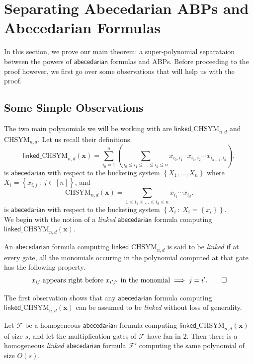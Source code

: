 \documentclass[10pt,a4paper]{article}
\def\set#1{\left\{ #1 \right\}}
\def\inparen#1{\left( #1 \right)}
\def\inbrace#1{\left\{ #1 \right\}}
\def\setdef#1#2{\inbrace{ #1 \ : \ #2}}
\def\vecx{\mathbf{x}}
\newcommand{\form}{\textbf{$\mathcal{F}$}}
\newcommand{\abcd}{\mathsf{abecedarian}}
\newcommand{\chsym}[2]{\mathrm{CHSYM}_{#1,#2}}
\newcommand{\lchsym}[2]{\mathrm{\mathsf{linked}\_CHSYM}_{#1,#2}}
\begin{document}
\section{Separating Abecedarian ABPs and Abecedarian Formulas}\label{sec:main}

In this section, we prove our main theorem: a super-polynomial separataion between the powers of $\abcd$ formulas and ABPs.
Before proceeding to the proof however, we first go over some observations that will help us with the proof.

\subsection{Some Simple Observations}

The two main polynomials we will be working with are $\lchsym{n}{d}$ and $\chsym{n}{d}$.
Let us recall their definitions.
\[
	\lchsym{n}{d}(\vecx) = \sum_{i_0=1}^{n} \inparen{\sum_{i_0 \leq i_1 \leq \ldots \leq i_d \leq n} x_{i_0, i_1} \cdot x_{i_1,i_2} \cdots x_{i_{d-1}, i_d}},
\]
is $\abcd$ with respect to the bucketing system $\set{X_1, \ldots, X_n}$ where $X_i = \setdef{x_{i,j}}{j \in [n]}$, and
\[
	\chsym{n}{d}(\vecx) = \sum_{1 \leq i_1 \leq \ldots \leq i_d \leq n} x_{i_1} \cdots x_{i_d}.	
\]
is $\abcd$ with respect to the bucketing system $\setdef{X_i}{X_i = \set{x_i}}$.\\

\noindent We begin with the notion of a \emph{linked} $\abcd$ formula computing $\lchsym{n}{d}(\vecx)$.

\begin{definition}
	An $\abcd$ formula computing $\lchsym{n}{d}$ is said to be \emph{linked} if at every gate, all the monomials occuring in the polynomial computed at that gate has the following property.
	\[
		x_{ij} \text{ appears right before } x_{i'j'} \text{ in the monomial} \implies j=i'. \qedhere	
	\]
\end{definition}

\noindent The first observation shows that any $\abcd$ formula computing $\lchsym{n}{d}(\vecx)$ can be assumed to be \emph{linked} without loss of generality.

\begin{observation}\label{obs:orderInterval}
	Let $\form$ be a homogeneous $\abcd$ formula computing $\lchsym{n}{d}(\vecx)$ of size $s$, and let the multiplication gates of $\form$ have fan-in $2$. 
	Then there is a homogeneous \emph{linked} $\abcd$ formula $\form'$ computing the same polynomial of size $O(s)$.
\end{observation}
\end{document}
